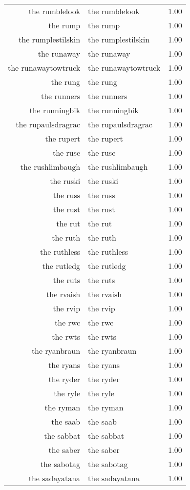 \begin{table}[ht]
\begin{tabular}{rlr}
  the rumblelook & the rumblelook & 1.00 \\ 
  the rump & the rump & 1.00 \\ 
  the rumplestilskin & the rumplestilskin & 1.00 \\ 
  the runaway & the runaway & 1.00 \\ 
  the runawaytowtruck & the runawaytowtruck & 1.00 \\ 
  the rung & the rung & 1.00 \\ 
  the runners & the runners & 1.00 \\ 
  the runningbik & the runningbik & 1.00 \\ 
  the rupaulsdragrac & the rupaulsdragrac & 1.00 \\ 
  the rupert & the rupert & 1.00 \\ 
  the ruse & the ruse & 1.00 \\ 
  the rushlimbaugh & the rushlimbaugh & 1.00 \\ 
  the ruski & the ruski & 1.00 \\ 
  the russ & the russ & 1.00 \\ 
  the rust & the rust & 1.00 \\ 
  the rut & the rut & 1.00 \\ 
  the ruth & the ruth & 1.00 \\ 
  the ruthless & the ruthless & 1.00 \\ 
  the rutledg & the rutledg & 1.00 \\ 
  the ruts & the ruts & 1.00 \\ 
  the rvaish & the rvaish & 1.00 \\ 
  the rvip & the rvip & 1.00 \\ 
  the rwc & the rwc & 1.00 \\ 
  the rwts & the rwts & 1.00 \\ 
  the ryanbraun & the ryanbraun & 1.00 \\ 
  the ryans & the ryans & 1.00 \\ 
  the ryder & the ryder & 1.00 \\ 
  the ryle & the ryle & 1.00 \\ 
  the ryman & the ryman & 1.00 \\ 
  the saab & the saab & 1.00 \\ 
  the sabbat & the sabbat & 1.00 \\ 
  the saber & the saber & 1.00 \\ 
  the sabotag & the sabotag & 1.00 \\ 
  the sadayatana & the sadayatana & 1.00 \\ 

\end{tabular}
\end{table}
